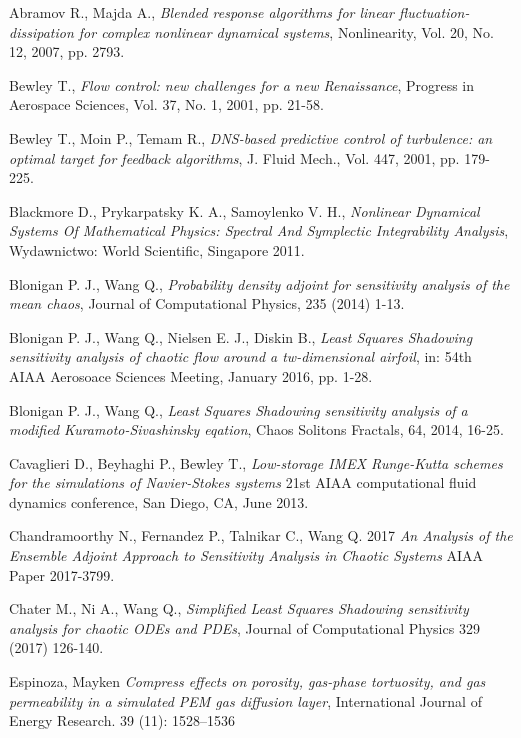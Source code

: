 \documentclass[12pt]{article}
\begin{document}
\begin{thebibliography}{99}

 Abramov R., Majda A.,
\emph{Blended response algorithms for linear fluctuation-dissipation for complex nonlinear dynamical systems},
Nonlinearity, Vol. 20, No. 12, 2007, pp. 2793.
	
 Bewley T.,
\emph{Flow control: new challenges for a new Renaissance},
Progress in Aerospace Sciences, Vol. 37, No. 1, 2001, pp. 21-58.

 Bewley T., Moin P., Temam R.,
\emph{DNS-based predictive control of turbulence: an optimal target for feedback algorithms},
J. Fluid Mech., Vol. 447, 2001, pp. 179-225.

 Blackmore D., Prykarpatsky K. A., Samoylenko V. H.,
\emph{Nonlinear Dynamical Systems Of Mathematical Physics: Spectral And Symplectic Integrability Analysis},
Wydawnictwo: World Scientific, Singapore 2011.

 Blonigan P. J., Wang Q.,
\emph{Probability density adjoint for sensitivity analysis of the mean chaos},
Journal of Computational Physics, 235 (2014) 1-13.

 Blonigan P. J., Wang Q., Nielsen E. J., Diskin B.,
\emph{Least Squares Shadowing sensitivity analysis of chaotic flow around a tw-dimensional airfoil},
in: 54th AIAA Aerosoace Sciences Meeting, January 2016, pp. 1-28.

 Blonigan P. J., Wang Q.,
\emph{Least Squares Shadowing sensitivity analysis of a modified Kuramoto-Sivashinsky eqation},
Chaos Solitons Fractals, 64, 2014, 16-25.

 Cavaglieri D., Beyhaghi P., Bewley T.,  
\emph{Low-storage IMEX Runge-Kutta schemes for the simulations of Navier-Stokes systems} 
21st AIAA computational fluid dynamics conference, San Diego, CA, June 2013.

 Chandramoorthy N., Fernandez P., Talnikar C., Wang Q. 2017 
\emph{An Analysis of the Ensemble Adjoint Approach to Sensitivity Analysis in Chaotic Systems} 
AIAA Paper 2017-3799. 

 Chater M., Ni A., Wang Q., 
\emph{Simplified Least Squares Shadowing sensitivity analysis for chaotic ODEs and PDEs},
Journal of Computational Physics 329 (2017) 126-140.

 Espinoza, Mayken 
\emph{Compress effects on porosity, gas-phase tortuosity, and gas permeability in a simulated PEM gas diffusion layer},
International Journal of Energy Research. 39 (11): 1528–1536


\end{thebibliography}
\end{document}
